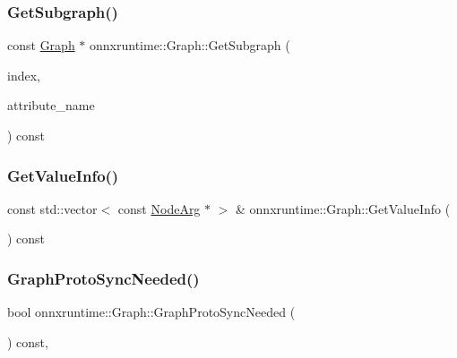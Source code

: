 \mbox{\label{classonnxruntime_1_1Graph_a863474f1c1ba9e413990640996e2e154}} 
\subsubsection{\texorpdfstring{Get\+Subgraph()}{GetSubgraph()}}
{\footnotesize\ttfamily const \mbox{\hyperlink{classonnxruntime_1_1Graph}{Graph}} $\ast$ onnxruntime\+::\+Graph\+::\+Get\+Subgraph (\begin{DoxyParamCaption}\item[{const \mbox{\hyperlink{namespaceonnxruntime_af8773b5c12b5d8fd9292eb2e268df760}{Node\+Index}}}]{index,  }\item[{const std\+::string \&}]{attribute\+\_\+name }\end{DoxyParamCaption}) const}

\mbox{\label{classonnxruntime_1_1Graph_a3fe55ea6089b37f31c4f1446b9a8e6b1}} 
\subsubsection{\texorpdfstring{Get\+Value\+Info()}{GetValueInfo()}}
{\footnotesize\ttfamily const std\+::vector$<$ const \mbox{\hyperlink{classonnxruntime_1_1NodeArg}{Node\+Arg}} $\ast$ $>$ \& onnxruntime\+::\+Graph\+::\+Get\+Value\+Info (\begin{DoxyParamCaption}{ }\end{DoxyParamCaption}) const\hspace{0.3cm}{\ttfamily [noexcept]}}

\mbox{\label{classonnxruntime_1_1Graph_ae1709643bf3a2f41c7ef59b532590a0f}} 
\subsubsection{\texorpdfstring{Graph\+Proto\+Sync\+Needed()}{GraphProtoSyncNeeded()}}
{\footnotesize\ttfamily bool onnxruntime\+::\+Graph\+::\+Graph\+Proto\+Sync\+Needed (\begin{DoxyParamCaption}{ }\end{DoxyParamCaption}) const\hspace{0.3cm}{\ttfamily [inline]}, {\ttfamily [noexcept]}}

